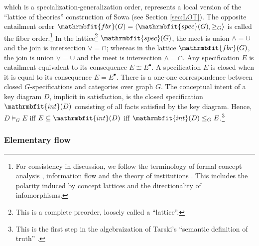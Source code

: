 \documentclass{amsart}
\theoremstyle{remark}
\theoremstyle{definition}
\begin{document}
which is a specialization-generalization order, 
represents a local version of
the ``lattice of theories'' construction of Sowa \cite{S:KR} (see Section \ref{sec:LOT}).
The opposite entailment order
$\mathrmbfit{fbr}(G) 
= {\langle{\mathrmbfit{spec}(G),\geq_{G}}\rangle}$
is called the fiber order.\footnote{For consistency in discussion,
we follow the terminology of formal concept analysis \cite{GW:FCA}, information flow \cite{BS:IF} and the theory of institutions \cite{GB:INS}.
This includes the polarity induced by concept lattices and the directionality of infomorphisms.}
%
In the lattice\footnote{This is a complete preorder,
loosely called a ``lattice''.}
$\mathrmbfit{spec}(G)$, 
the meet is union $\wedge = \cup$ and the join is intersection $\vee = \cap$;
whereas
in the lattice $\mathrmbfit{fbr}(G)$, the join is union $\vee = \cup$ and the meet is intersection $\wedge = \cap$.
Any specification $E$ is entailment equivalent to its consequence $E \cong E^{\scriptstyle\bullet}$.
A specification $E$ is closed when it is equal to its consequence $E = E^{\scriptstyle\bullet}$.
There is a one-one correspondence between closed $G$-specifications and categories over graph $G$.
%
%
The conceptual intent
of a key diagram $D$, 
implicit in satisfaction,
is the closed specification $\mathrmbfit{int}(D)$ consisting of all facts satisfied by the key diagram. 
%
Hence,
$D \models_{G} E$
iff
$E \subseteq \mathrmbfit{int}(D)$
iff
$\mathrmbfit{int}(D) \leq_{G} E$.\footnote{This is the first step in the algebraization of Tarski's ``semantic definition of truth'' \cite{K:AT}.}

\subsubsection{Elementary flow}
\end{document}

